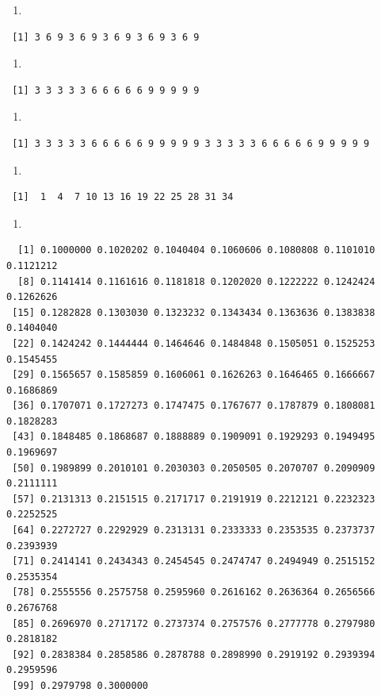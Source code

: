 \documentclass[
  letterpaper,
  DIV=11,
  numbers=noendperiod]{scrreprt}
\providecommand{\tightlist}{%
  \setlength{\itemsep}{0pt}\setlength{\parskip}{0pt}}\usepackage{longtable,booktabs,array}
\begin{document}
\begin{enumerate}
\def\labelenumi{\roman{enumi}.}
\setcounter{enumi}{1}
\tightlist
\item
\end{enumerate}

\begin{verbatim}
 [1] 3 6 9 3 6 9 3 6 9 3 6 9 3 6 9
\end{verbatim}

\begin{enumerate}
\def\labelenumi{\roman{enumi}.}
\setcounter{enumi}{2}
\tightlist
\item
\end{enumerate}

\begin{verbatim}
 [1] 3 3 3 3 3 6 6 6 6 6 9 9 9 9 9
\end{verbatim}

\begin{enumerate}
\def\labelenumi{\roman{enumi}.}
\setcounter{enumi}{3}
\tightlist
\item
\end{enumerate}

\begin{verbatim}
 [1] 3 3 3 3 3 6 6 6 6 6 9 9 9 9 9 3 3 3 3 3 6 6 6 6 6 9 9 9 9 9
\end{verbatim}

\begin{enumerate}
\def\labelenumi{\alph{enumi}.}
\setcounter{enumi}{21}
\tightlist
\item
\end{enumerate}

\begin{verbatim}
 [1]  1  4  7 10 13 16 19 22 25 28 31 34
\end{verbatim}

\begin{enumerate}
\def\labelenumi{\roman{enumi}.}
\setcounter{enumi}{5}
\tightlist
\item
\end{enumerate}

\begin{verbatim}
  [1] 0.1000000 0.1020202 0.1040404 0.1060606 0.1080808 0.1101010 0.1121212
  [8] 0.1141414 0.1161616 0.1181818 0.1202020 0.1222222 0.1242424 0.1262626
 [15] 0.1282828 0.1303030 0.1323232 0.1343434 0.1363636 0.1383838 0.1404040
 [22] 0.1424242 0.1444444 0.1464646 0.1484848 0.1505051 0.1525253 0.1545455
 [29] 0.1565657 0.1585859 0.1606061 0.1626263 0.1646465 0.1666667 0.1686869
 [36] 0.1707071 0.1727273 0.1747475 0.1767677 0.1787879 0.1808081 0.1828283
 [43] 0.1848485 0.1868687 0.1888889 0.1909091 0.1929293 0.1949495 0.1969697
 [50] 0.1989899 0.2010101 0.2030303 0.2050505 0.2070707 0.2090909 0.2111111
 [57] 0.2131313 0.2151515 0.2171717 0.2191919 0.2212121 0.2232323 0.2252525
 [64] 0.2272727 0.2292929 0.2313131 0.2333333 0.2353535 0.2373737 0.2393939
 [71] 0.2414141 0.2434343 0.2454545 0.2474747 0.2494949 0.2515152 0.2535354
 [78] 0.2555556 0.2575758 0.2595960 0.2616162 0.2636364 0.2656566 0.2676768
 [85] 0.2696970 0.2717172 0.2737374 0.2757576 0.2777778 0.2797980 0.2818182
 [92] 0.2838384 0.2858586 0.2878788 0.2898990 0.2919192 0.2939394 0.2959596
 [99] 0.2979798 0.3000000
\end{verbatim}
\end{document}
